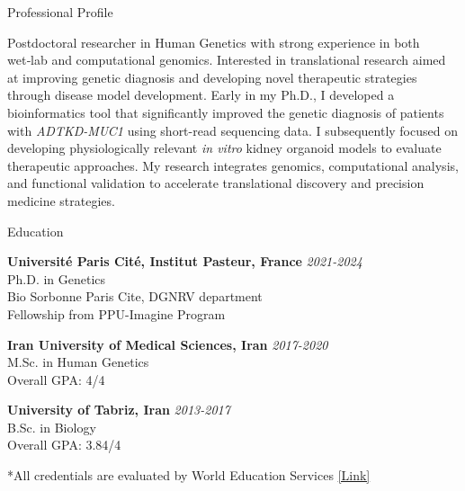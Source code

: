 \documentclass[
	11pt, %
]{resume} %
\begin{document}

\begin{rSection}{Professional Profile}

Postdoctoral researcher in Human Genetics with strong experience in both wet‑lab and computational genomics. Interested in translational research aimed at improving genetic diagnosis and developing novel therapeutic strategies through disease model development. Early in my Ph.D., I developed a bioinformatics tool that significantly improved the genetic diagnosis of patients with \textit{ADTKD-MUC1} using short-read sequencing data. I subsequently focused on developing physiologically relevant \textit{in vitro} kidney organoid models to evaluate therapeutic approaches. My research integrates genomics, computational analysis, and functional validation to accelerate translational discovery and precision medicine strategies.

\end{rSection}



\begin{rSection}{Education}
	
	\textbf{Université Paris Cité, Institut Pasteur, France} \hfill \textit{2021-2024} \\ 
	Ph.D. in Genetics \\
	Bio Sorbonne Paris Cite, DGNRV department \\
	Fellowship from PPU-Imagine Program 
	
	\textbf{Iran University of Medical Sciences, Iran} \hfill \textit{2017-2020} \\ 
	M.Sc. in Human Genetics  \\
	Overall GPA: 4/4
	
	\textbf{University of Tabriz, Iran} \hfill \textit{2013-2017} \\ 
	B.Sc. in Biology  \\
	Overall GPA: 3.84/4
	
	*All credentials are evaluated by World Education Services \href{https://www.credly.com/badges/866e14ca-d9e4-4c67-a419-0ade95cb1ddb/public_url}{[Link]}
	
\end{rSection}
\end{document}
